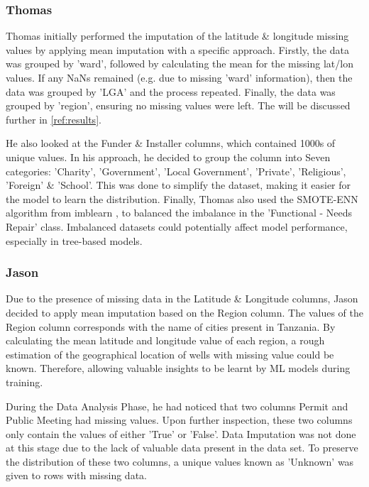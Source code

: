\documentclass[conference]{IEEEtran}
\begin{document}
\subsubsection{Thomas}

Thomas initially performed the imputation of the latitude \& longitude missing values by applying mean imputation with a specific approach. Firstly, the data was grouped by 'ward', followed by calculating the mean for the missing lat/lon values. If any NaNs remained (e.g. due to missing 'ward' information), then the data was grouped by 'LGA' and the process repeated. Finally, the data was grouped by 'region', ensuring no missing values were left. The will be discussed further in \ref{ref:results}.

He also looked at the Funder \& Installer columns, which contained 1000s of unique values. In his approach, he decided to group the column into Seven categories: 'Charity', 'Government', 'Local Government', 'Private', 'Religious', 'Foreign' \& 'School'. This was done to simplify the dataset, making it easier for the model to learn the distribution. Finally, Thomas also used the SMOTE-ENN algorithm from imblearn \cite{smote-enn}, to balanced the imbalance in the 'Functional - Needs Repair' class. Imbalanced datasets could potentially affect model performance, especially in tree-based models.

\subsubsection{Jason}

Due to the presence of missing data in the Latitude \& Longitude columns, Jason decided to apply mean imputation based on the Region column. The values of the Region column corresponds with the name of cities present in Tanzania. By calculating the  mean latitude and longitude value of each region, a rough estimation of the geographical location of wells with missing value could be known. Therefore, allowing valuable insights to be learnt by ML models during training.

During the Data Analysis Phase, he had noticed that two columns Permit and Public Meeting had missing values. Upon further inspection, these two columns only contain the values of either 'True' or 'False'. Data Imputation was not done at this stage due to the lack of valuable data present in the data set. To preserve the distribution of these two columns, a unique values known as 'Unknown' was given to rows with missing data.
\end{document}
